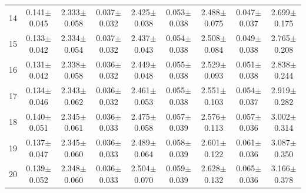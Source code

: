 \begin{table}[H]
{\begin{tabular}{c cc cc cc cc}
14 & 0.141$\pm$0.045 & 2.333$\pm$0.058 & 0.037$\pm$0.032 & 2.425$\pm$0.038 & 0.053$\pm$0.038 & 2.488$\pm$0.075 & 0.047$\pm$0.037 & 2.699$\pm$0.175 \\
15 & 0.133$\pm$0.042 & 2.334$\pm$0.054 & 0.037$\pm$0.032 & 2.437$\pm$0.043 & 0.054$\pm$0.038 & 2.508$\pm$0.084 & 0.049$\pm$0.038 & 2.765$\pm$0.208 \\
16 & 0.131$\pm$0.042 & 2.338$\pm$0.058 & 0.036$\pm$0.032 & 2.449$\pm$0.048 & 0.055$\pm$0.038 & 2.529$\pm$0.093 & 0.051$\pm$0.038 & 2.838$\pm$0.244 \\
17 & 0.134$\pm$0.046 & 2.343$\pm$0.062 & 0.036$\pm$0.032 & 2.461$\pm$0.053 & 0.055$\pm$0.038 & 2.551$\pm$0.103 & 0.054$\pm$0.037 & 2.919$\pm$0.282 \\
18 & 0.140$\pm$0.051 & 2.345$\pm$0.061 & 0.036$\pm$0.033 & 2.475$\pm$0.058 & 0.057$\pm$0.039 & 2.576$\pm$0.113 & 0.057$\pm$0.036 & 3.002$\pm$0.314 \\
19 & 0.137$\pm$0.047 & 2.345$\pm$0.060 & 0.036$\pm$0.033 & 2.489$\pm$0.064 & 0.058$\pm$0.039 & 2.601$\pm$0.122 & 0.061$\pm$0.036 & 3.087$\pm$0.350 \\
20 & 0.139$\pm$0.052 & 2.348$\pm$0.060 & 0.036$\pm$0.033 & 2.504$\pm$0.070 & 0.059$\pm$0.039 & 2.628$\pm$0.132 & 0.065$\pm$0.036 & 3.166$\pm$0.378 \\

\bottomrule

\end{tabular}
}
\end{table}
